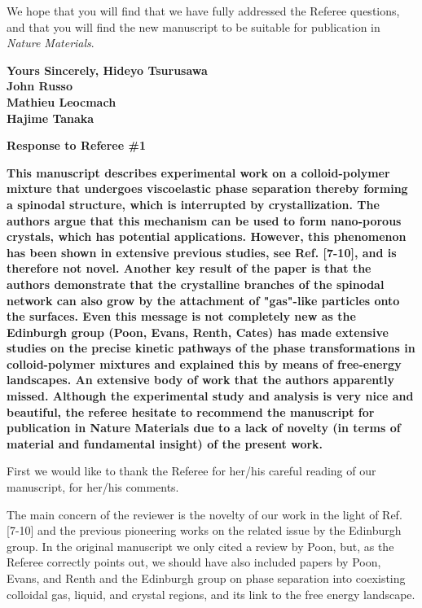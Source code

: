 \documentclass[11pt,a4paper]{article}
\newenvironment{referee}%
{\bigskip\singlespacing\bf}%
{\par\bigskip}
\begin{document}
We hope that you will find that we have fully addressed the Referee questions, and
that you will find the new manuscript to be suitable for publication in \emph{Nature Materials}.




\vskip 0.8cm

\noindent
{\bf Yours Sincerely,
\vskip 0.3cm
\indent Hideyo Tsurusawa\\
\indent John Russo\\
\indent Mathieu Leocmach\\
\indent Hajime Tanaka}

\clearpage

\noindent
\begin{Large}
{\bf Response to Referee \#1}
\end{Large}

\begin{referee}
This manuscript describes experimental work on a colloid-polymer mixture that undergoes viscoelastic phase separation thereby forming a spinodal structure, which is interrupted by crystallization. The authors argue that this mechanism can be used to form nano-porous crystals, which has potential applications. However, this phenomenon has been shown in extensive previous studies, see Ref. [7-10], and is therefore not novel. Another key result of the paper is that the authors demonstrate that the crystalline branches of the spinodal network can also grow by the attachment of "gas"-like particles onto the surfaces. Even this message is not completely new as the Edinburgh group (Poon, Evans, Renth, Cates) has made extensive studies on the precise kinetic pathways of the phase transformations in colloid-polymer mixtures and explained this by means of free-energy landscapes. An extensive body of work that the authors apparently missed. Although the experimental study and analysis is very nice and beautiful, the 
referee hesitate to recommend the manuscript for publication in Nature Materials due to a lack of novelty (in terms of material and fundamental insight) of the present work.
\end{referee}

First we would like to thank the Referee for her/his careful reading of our manuscript, for her/his comments. 

The main concern of the reviewer is the novelty of our work in the light of Ref. [7-10] and the previous pioneering works on the related issue by the Edinburgh group. In the original manuscript we only cited a review by Poon, but, as the Referee correctly points out, we should have
also included papers by Poon, Evans, and Renth and the Edinburgh group on phase separation into coexisting colloidal gas, liquid, and crystal regions, and its link to the free energy landscape.
\end{document}
